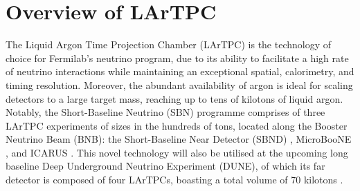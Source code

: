 \section{Overview of LArTPC}
\label{sec3:overview}
The Liquid Argon Time Projection Chamber (LArTPC) is the technology of choice for Fermilab's neutrino program, due to its ability to facilitate a high rate of neutrino interactions while maintaining an exceptional spatial, calorimetry, and timing resolution. 
Moreover, the abundant availability of argon is ideal for scaling detectors to a large target mass, reaching up to tens of kilotons of liquid argon.
Notably, the Short-Baseline Neutrino (SBN) programme \cite{SBNProgram} comprises of three LArTPC experiments of sizes in the hundreds of tons, located along the Booster Neutrino Beam (BNB): the Short-Baseline Near Detector (SBND) \cite{sbnd_det}, MicroBooNE \cite{ubooneDet}, and ICARUS \cite{icarus_det}.
This novel technology will also be utilised at the upcoming long baseline Deep Underground Neutrino Experiment (DUNE), of which its far detector is composed of four LArTPCs, boasting a total volume of 70 kilotons \cite{dunefd_det}.


